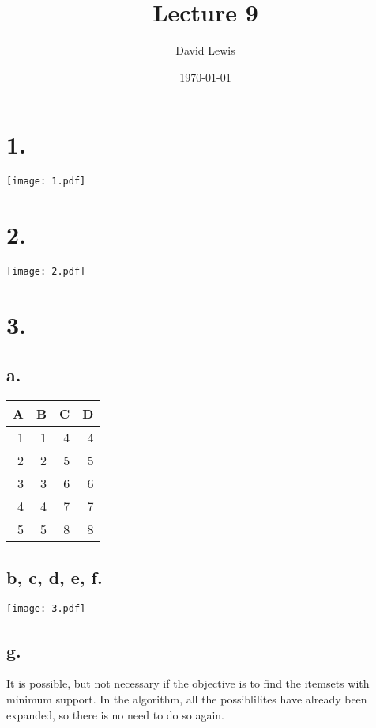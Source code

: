 \documentclass[11pt]{article}
\author{David Lewis}
\date{\today}
\title{Lecture 9}
\begin{document}
\maketitle
\section*{1.}
\label{sec:org49a0587}
\begin{center}
\texttt{[image: 1.pdf]}
\end{center}
\section*{2.}
\label{sec:org18f612b}
\begin{center}
\texttt{[image: 2.pdf]}
\end{center}
\section*{3.}
\label{sec:org0e7e1b2}
\subsection*{a.}
\label{sec:org9f6e0d5}
\begin{center}
\begin{tabular}{rrrr}
A & B & C & D\\
\hline
1 & 1 & 4 & 4\\
2 & 2 & 5 & 5\\
3 & 3 & 6 & 6\\
4 & 4 & 7 & 7\\
5 & 5 & 8 & 8\\
\end{tabular}
\end{center}
\subsection*{b, c, d, e, f.}
\label{sec:orgf9d1add}
\begin{center}
\texttt{[image: 3.pdf]}
\end{center}
\subsection*{g.}
\label{sec:orgb6d7d43}
It is possible, but not necessary if the objective is to find the itemsets with
minimum support. In the algorithm, all the possiblilites have already been
expanded, so there is no need to do so again.
\end{document}

